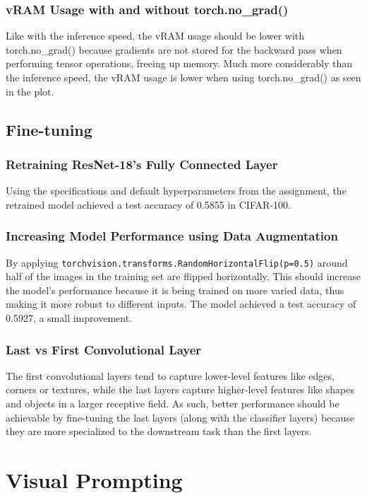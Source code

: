 \documentclass[a4paper]{article}
\begin{document}
\subsubsection{vRAM Usage with and without torch.no\_grad()}
Like with the inference speed, the vRAM usage should be lower with torch.no\_grad() because gradients are not
stored for the backward pass when performing tensor operations, freeing up memory. Much more considerably than the
inference speed, the vRAM usage is lower when using torch.no\_grad() as seen in the plot.
\bigskip

\subsection{Fine-tuning}
\subsubsection{Retraining ResNet-18's Fully Connected Layer}
Using the specifications and default hyperparameters from the assignment, the retrained model achieved a test
accuracy of 0.5855 in CIFAR-100.

\subsubsection{Increasing Model Performance using Data Augmentation}
By applying \texttt{torchvision.transforms.RandomHorizontalFlip(p=0.5)} around half of the images in the training
set are flipped horizontally. This should increase the model's performance because it is being trained on more
varied data, thus making it more robust to different inputs. The model achieved a test accuracy of 0.5927, a small
improvement.

\subsubsection{Last vs First Convolutional Layer}
The first convolutional layers tend to capture lower-level features like edges, corners or textures, while the last
layers capture higher-level features like shapes and objects in a larger receptive field. As such, better performance
should be achievable by fine-tuning the last layers (along with the classifier layers) because they are more
specialized to the downstream task than the first layers.
\newpage

\section{Visual Prompting}
\end{document}
